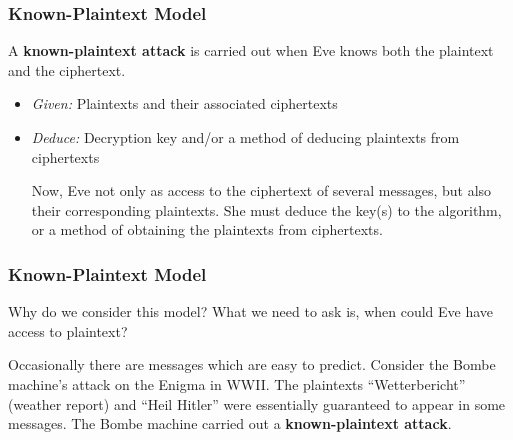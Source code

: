 \documentclass{beamer}
\newcommand{\<}{\langle}
\renewcommand{\>}{\rangle}
\begin{document}
\begin{frame}
\frametitle{Known-Plaintext Model}

A \textbf{known-plaintext attack} is carried out when Eve knows both the plaintext and the ciphertext. 

\begin{itemize}
\item \emph{Given:} Plaintexts and their associated ciphertexts
\item \emph{Deduce:} Decryption key and/or a method of deducing plaintexts from ciphertexts

Now, Eve not only as access to the ciphertext of several messages, but also their corresponding plaintexts. She must deduce the key(s) to the algorithm, or a method of obtaining the plaintexts from ciphertexts.
\end{itemize}
\end{frame}


\begin{frame}
\frametitle{Known-Plaintext Model}

Why do we consider this model? What we need to ask is, when could Eve have access to plaintext?\newline

Occasionally there are messages which are easy to predict. Consider the Bombe machine's attack on the Enigma in WWII. The plaintexts ``Wetterbericht'' (weather report) and ``Heil Hitler'' were essentially guaranteed to appear in some messages. The Bombe machine carried out a \textbf{known-plaintext attack}. 
\end{frame}
\end{document}
